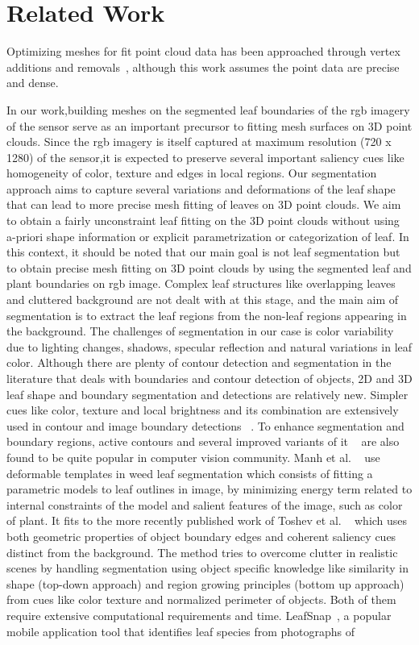 \section{Related Work}
\label{sec:related}


Optimizing meshes for fit point cloud data has been approached through vertex additions and removals~\cite{hoppe:1994}, although this work assumes the point data are precise and dense.

In our work,building meshes on the segmented leaf boundaries of the rgb imagery of the sensor serve as an important precursor to fitting mesh surfaces on 3D point clouds. Since the rgb imagery is itself captured at maximum resolution (720 x 1280) of the sensor,it is expected to preserve several important saliency cues like homogeneity of color, texture and edges in local regions. Our segmentation approach aims to capture several variations and deformations of the leaf shape that can lead to more precise mesh fitting of leaves on 3D point clouds. We aim to obtain a fairly unconstraint leaf fitting on the 3D point clouds without using a-priori shape information or explicit parametrization or categorization of leaf. In this context, it should be noted that our main goal is not leaf segmentation but to obtain precise mesh fitting on 3D point clouds by using the segmented leaf and plant boundaries on rgb image. Complex leaf structures like overlapping leaves and cluttered background are not dealt with at this stage, and the main aim of segmentation is to extract the leaf regions from the non-leaf regions appearing in the background. The challenges of segmentation in our case is color variability due to lighting changes, shadows, specular reflection and natural variations in leaf color. Although there are plenty of contour detection and segmentation in the literature that deals with boundaries and contour detection of objects, 2D and 3D leaf shape and boundary segmentation and detections are relatively new. Simpler cues like color, texture and local brightness and its combination are extensively used in contour and image boundary detections ~\cite{martin2004learning,valliammal2012leaf}. To enhance segmentation and boundary regions, active contours and several improved variants of it ~\cite{mishra2011decoupled} are also found to be quite popular in computer vision community. Manh et al. ~\cite{Manh2001139} use deformable templates in weed leaf segmentation which consists of fitting a parametric models to leaf outlines in image, by minimizing energy term related to internal constraints of the model and salient features of the image, such as color of plant. It fits to the more recently published work of Toshev et al. ~\cite{toshev2012shape} which uses both geometric properties of object boundary edges and coherent saliency cues distinct from the background. The method tries to overcome clutter in realistic scenes by handling segmentation using object specific knowledge like similarity in shape (top-down approach) and region growing principles (bottom up approach) from cues like color texture and normalized perimeter of objects. Both of them require extensive computational requirements and time. LeafSnap~\cite{kumar2012leafsnap}, a popular mobile application tool that identifies leaf species from photographs of 